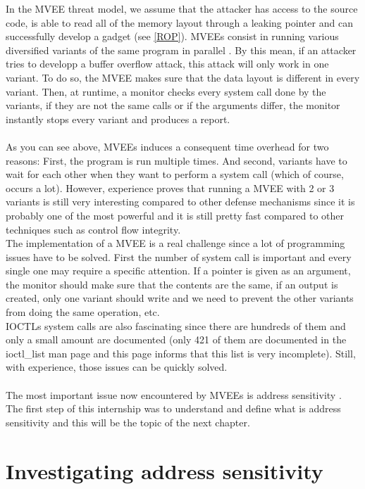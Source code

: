 \documentclass[english]{enstaPRE}
\begin{document}
In the MVEE threat model, we assume that the attacker has access to the source code, is able to read all of the memory layout through a leaking pointer and 
can successfully develop a gadget (see \ref{ROP}).
MVEEs consist in running various diversified variants of the same program in parallel \cite{DBLP:conf/eurosys/SalamatJGF09}. By this mean, if an attacker tries to developp
a buffer overflow attack, this attack will only work in one variant. To do so, the MVEE makes sure that the data layout is 
different in every variant. Then, at runtime, a monitor checks every system call done by the variants, if they are not the same
calls or if the arguments differ, the monitor instantly stops every variant and produces a report. \\
 \\
As you can see above, MVEEs induces a consequent time overhead for two reasons: First, the program is run multiple times. And second,
variants have to wait for each other when they want to perform a system call (which of course, occurs a lot).
However, experience proves that running a MVEE with 2 or 3 variants is still very interesting compared to other defense mechanisms 
since it is probably one of the most powerful and it is still pretty fast compared to other techniques such as control flow integrity.
\\The implementation of a MVEE is a real challenge since a lot of programming issues have to be solved.
First the number of system call is important and every single one may require a specific attention. If a pointer is given as an argument,
the monitor should make sure that the contents are the same, if an output is created, only one variant should write and we need to 
prevent the other variants from doing the same operation, etc. \\ IOCTLs system calls are also fascinating since there are hundreds 
of them and only a small amount are documented (only 421 of them are documented in the ioctl\_list man page and this page informs 
that this list is very incomplete).  Still, with experience, those issues can be quickly solved.
\\ \\
The most important issue now encountered by MVEEs  is address sensitivity . The first step of this internship was to understand and 
define what is address sensitivity and this will be the topic of the next chapter.

\chapter{Investigating address sensitivity}
\end{document}

